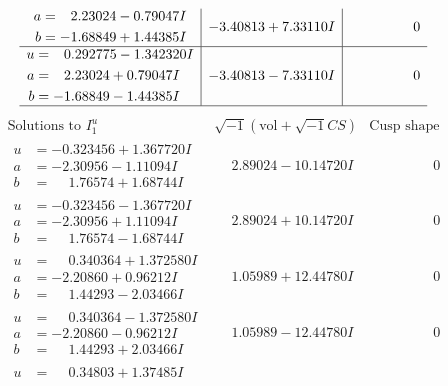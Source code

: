 \documentclass[1p]{elsarticle_modified}
\theoremstyle{definition}
\newcommand{\I}{\sqrt{-1}}
\begin{document}
$$\begin{array}{c|c|c}
\begin{aligned}
a &= \phantom{-}2.23024 - 0.79047 I \\
b &= -1.68849 + 1.44385 I\end{aligned}
 & -3.40813 + 7.33110 I & \phantom{-0.000000 } 0 \\ \hline\begin{aligned}
u &= \phantom{-}0.292775 - 1.342320 I \\
a &= \phantom{-}2.23024 + 0.79047 I \\
b &= -1.68849 - 1.44385 I\end{aligned}
 & -3.40813 - 7.33110 I & \phantom{-0.000000 } 0\\
 \hline 
 \end{array}$$\newpage$$\begin{array}{c|c|c}  
\text{Solutions to }I^u_{1}& \I (\text{vol} + \sqrt{-1}CS) & \text{Cusp shape}\\
 \hline 
\begin{aligned}
u &= -0.323456 + 1.367720 I \\
a &= -2.30956 - 1.11094 I \\
b &= \phantom{-}1.76574 + 1.68744 I\end{aligned}
 & \phantom{-}2.89024 - 10.14720 I & \phantom{-0.000000 } 0 \\ \hline\begin{aligned}
u &= -0.323456 - 1.367720 I \\
a &= -2.30956 + 1.11094 I \\
b &= \phantom{-}1.76574 - 1.68744 I\end{aligned}
 & \phantom{-}2.89024 + 10.14720 I & \phantom{-0.000000 } 0 \\ \hline\begin{aligned}
u &= \phantom{-}0.340364 + 1.372580 I \\
a &= -2.20860 + 0.96212 I \\
b &= \phantom{-}1.44293 - 2.03466 I\end{aligned}
 & \phantom{-}1.05989 + 12.44780 I & \phantom{-0.000000 } 0 \\ \hline\begin{aligned}
u &= \phantom{-}0.340364 - 1.372580 I \\
a &= -2.20860 - 0.96212 I \\
b &= \phantom{-}1.44293 + 2.03466 I\end{aligned}
 & \phantom{-}1.05989 - 12.44780 I & \phantom{-0.000000 } 0 \\ \hline\begin{aligned}
u &= \phantom{-}0.34803 + 1.37485 I \\

\end{aligned}
\end{array}$$
\end{document}
